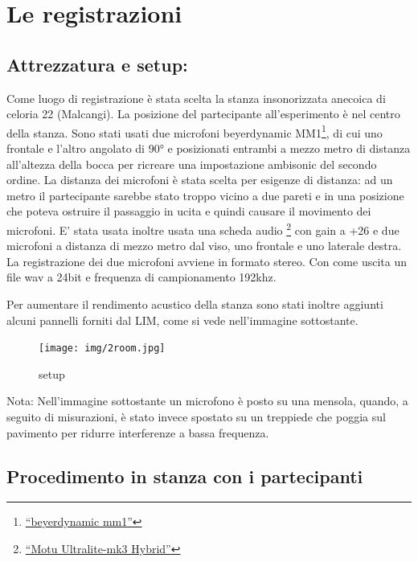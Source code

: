 \documentclass[
]{article}
\begin{document}
\section{Le registrazioni}\label{le-registrazioni}

\subsection{Attrezzatura e setup:}\label{attrezzatura-e-setup}

Come luogo di registrazione è stata scelta la stanza insonorizzata anecoica di celoria 22 (Malcangi). La posizione del partecipante all'esperimento è nel centro della stanza. Sono stati usati due microfoni beyerdynamic MM1\footnote{\href{beyerdynamic\%20mm1}{``beyerdynamic mm1''}}, di cui uno frontale e l'altro angolato di 90° e posizionati entrambi a mezzo metro di distanza all'altezza della bocca per ricreare una impostazione ambisonic del secondo ordine. La distanza dei microfoni è stata scelta per esigenze di distanza: ad un metro il partecipante sarebbe stato troppo vicino a due pareti e in una posizione che poteva ostruire il passaggio in ucita e quindi causare il movimento dei microfoni. E' stata usata inoltre usata una scheda audio \footnote{\href{https://motu.com/products/motuaudio/ultralite-mk3/i-o.html}{``Motu Ultralite-mk3 Hybrid''}} con gain a +26 e due microfoni a distanza di mezzo metro dal viso, uno frontale e uno laterale destra. La registrazione dei due microfoni avviene in formato stereo. Con come uscita un file wav a 24bit e frequenza di campionamento 192khz.

Per aumentare il rendimento acustico della stanza sono stati inoltre aggiunti alcuni pannelli forniti dal LIM, come si vede nell'immagine sottostante.

\begin{figure}
\centering
\texttt{[image: img/2room.jpg]}
\caption{setup}
\end{figure}

Nota: Nell'immagine sottostante un microfono è posto su una mensola, quando, a seguito di misurazioni, è stato invece spostato su un treppiede che poggia sul pavimento per ridurre interferenze a bassa frequenza.

\subsection{Procedimento in stanza con i partecipanti}\label{procedimento-in-stanza-con-i-partecipanti}
\end{document}
